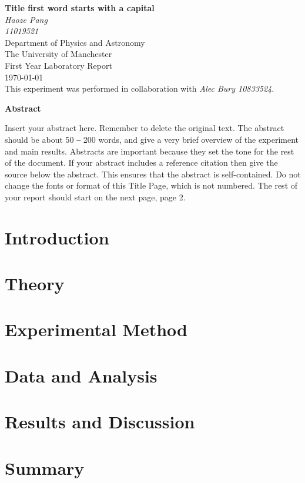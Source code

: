 \documentclass[a4paper,12pt]{article}
\begin{document}
{\pagestyle{empty}
	\begin{center}
		{\LARGE\bfseries Title first word starts with a capital\\
		
		}
		\vspace{\baselineskip}
		{\itshape Haoze Pang \\
			11019521\\
		}
		\vspace{\baselineskip}	
		Department of Physics and Astronomy\\
		The University of Manchester\\
		\vspace{\baselineskip}	
		First Year Laboratory Report\\
		\vspace{\baselineskip}	
		{\today}\\
		\vspace{2\baselineskip}		
		This experiment was performed in collaboration with \textit{Alec Bury 10833524}.
	\end{center}
	\vspace{4\baselineskip}
	\textbf{Abstract}
	
	Insert your abstract here.  Remember to delete the original text.  The abstract should be about 50 ‒ 200 words, and give a very brief overview of the experiment and main results.  Abstracts are important because they set the tone for the rest of the document.  If your abstract includes a reference citation then give the source below the abstract.  This ensures that the abstract is self-contained.  Do not change the fonts or format of this Title Page, which is not numbered.  The rest of your report should start on the next page, page 2.
\clearpage}
\section{Introduction}
\section{Theory}
\section{Experimental Method}
\section{Data and Analysis}
\section{Results and Discussion}
\section{Summary}


\end{document}
